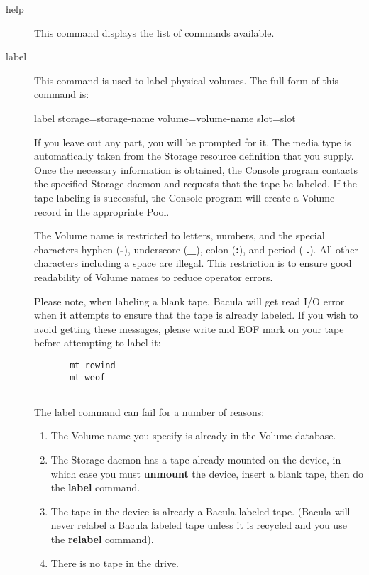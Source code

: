 \begin{description}
\item [help]
   This command displays the list of commands available.  

\item [label]
   This command is used to label physical volumes.  The full form of this command
is:

label storage=\lt{}storage-name\gt{} volume=\lt{}volume-name\gt{}
slot=\lt{}slot\gt{}  

If you leave out any part, you will be prompted for it.  The media type is
automatically taken from the Storage resource  definition that you supply.
Once the necessary information is  obtained, the Console program contacts the
specified Storage  daemon and requests that the tape be labeled. If the tape
labeling  is successful, the Console program will create a Volume record  in
the appropriate Pool.  

The Volume name is restricted to letters, numbers, and  the special characters
hyphen ({\bf -}), underscore ({\bf \_}),  colon ({\bf :}), and period ({\bf
.}).  All other characters including a space are illegal.  This restriction is
to ensure good readability of Volume names  to reduce operator errors.  

Please note, when labeling a blank tape, Bacula will get  read I/O error when
it attempts to ensure that the tape is already  labeled. If you wish to avoid
getting these messages, please write  and EOF mark on your tape before
attempting to label it:  

\footnotesize
\begin{verbatim}
       mt rewind
       mt weof
       
\end{verbatim}
\normalsize

The label command can fail for a number of reasons:  

   \begin{enumerate}
   \item The Volume name you specify is already in the  Volume database.  
   \item The Storage daemon has a tape already mounted on the  device, in which
   case you must {\bf unmount}  the device, insert a blank tape, then do the 
   {\bf label} command.  
   \item The tape in the device is already a Bacula labeled tape.  (Bacula will
   never relabel a Bacula labeled tape unless  it is recycled and you use the
   {\bf relabel} command).  
   \item There is no tape in the drive.  
   \end{enumerate}


\end{description}
